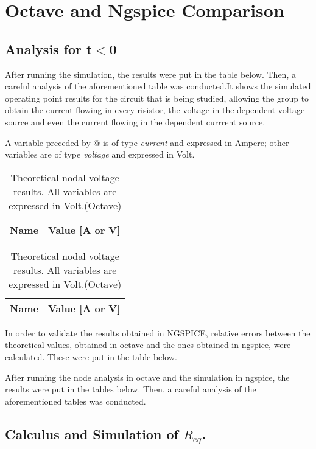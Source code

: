 \section{Octave and Ngspice Comparison} \label{section:comp}

\subsection{Analysis for t$<$0}

After running the simulation, the results were put in the table below. Then, a careful analysis of the aforementioned table was conducted.It shows the simulated operating point results for the circuit that is being studied, allowing the group to obtain the current flowing in every risistor, the voltage in the dependent voltage source and even the current flowing in the dependent currrent source. 

A variable preceded by @ is of type {\em current} and expressed in Ampere; other variables are of type {\it voltage} and expressed in
    Volt.
\begin{table}[ht]
\parbox{.45\linewidth}{
  \centering
  \begin{tabular}{|l|r|}
    \hline    
    {\bf Name} & {\bf Value [A or V]} \\ \hline
    
  \end{tabular}
  \caption{Simulation nodal voltage results. All variables are expressed in Volt or Ampere. (Ngspice)}} 
\parbox{.45\linewidth}{
  \centering
  \begin{tabular}{|l|r|}
    \hline    
    {\bf Name} & {\bf Value [A or V]} \\ \hline
    
  \end{tabular}
  \caption{Theoretical nodal voltage results. All variables are expressed in Volt.(Octave)}}
 
\end{table}


In order to validate the results obtained in NGSPICE, relative errors between the theoretical values, obtained in octave and the ones obtained in ngspice, were calculated. These were put in the table below.



After running the node analysis in octave and the simulation in ngspice, the results were put in the tables below. Then, a careful analysis of the aforementioned tables was conducted.


\clearpage
\subsection{Calculus and Simulation of $R_{eq}$.}

